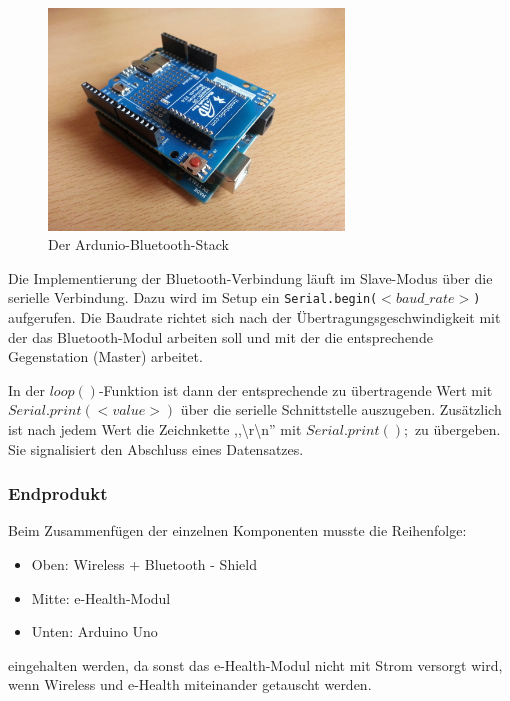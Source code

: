\documentclass[10pt, a4paper, oneside, titlepage]{scrartcl} %
\begin{document}
	\begin{figure}[hbtp]
	\centering
	\includegraphics[width=0.7\textwidth]{implementierung_arduino+wireless-shield.jpg}
	\caption{Der Ardunio-Bluetooth-Stack}
	\label{fig:Arduino-Bluetooth-Stack}
	\end{figure}
	
	Die Implementierung der Bluetooth-Verbindung läuft im Slave-Modus über die serielle Verbindung. Dazu wird im Setup ein \texttt{Serial.begin($<baud\_rate>$)} aufgerufen. Die Baudrate richtet sich nach der Übertragungsgeschwindigkeit mit der das Bluetooth-Modul arbeiten soll und mit der die entsprechende Gegenstation (Master) arbeitet. 
	
	In der $loop()$-Funktion ist dann der entsprechende zu übertragende Wert mit \\$Serial.print(<value>)$ über die serielle Schnittstelle auszugeben. Zusätzlich ist nach jedem Wert die Zeichnkette ,,\textbackslash r\textbackslash n'' mit $Serial.print();$ zu übergeben. Sie signalisiert den Abschluss eines Datensatzes.
	
	
	\subsubsection{Endprodukt}

	Beim Zusammenfügen der einzelnen Komponenten musste die Reihenfolge:
	\begin{itemize}
	\item Oben: Wireless + Bluetooth - Shield
	\item Mitte: e-Health-Modul
	\item Unten: Arduino Uno
	\end{itemize}
	
	eingehalten werden, da sonst das e-Health-Modul nicht mit Strom versorgt wird, wenn Wireless und e-Health miteinander getauscht werden. 
	
\end{document}
